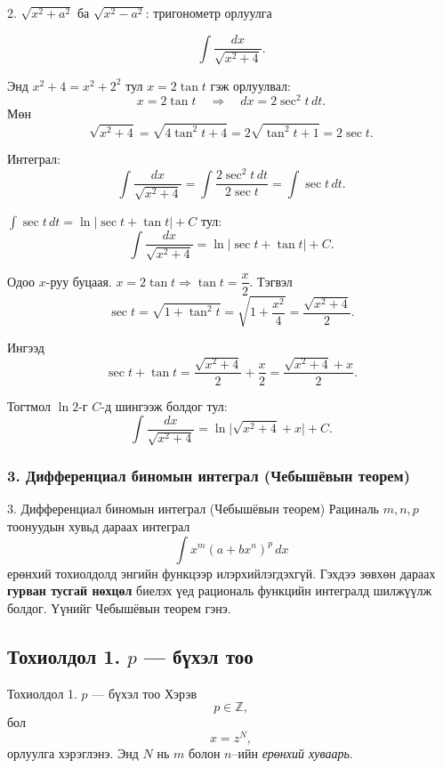 \begin{frame}[allowframebreaks]{2. $\sqrt{x^2+a^2}$ ба $\sqrt{x^2-a^2}$: тригонометр орлуулга}
\begin{example}
\[
\int \frac{dx}{\sqrt{x^2+4}}.
\]

Энд $x^2+4 = x^2+2^2$ тул $x=2\tan t$ гэж орлуулвал:
\[
x = 2\tan t \quad\Rightarrow\quad dx = 2\sec^2 t\,dt.
\]
Мөн
\[
\sqrt{x^2+4}
= \sqrt{4\tan^2 t + 4}
= 2\sqrt{\tan^2 t+1}
= 2\sec t.
\]

Интеграл:
\[
\int \frac{dx}{\sqrt{x^2+4}}
= \int \frac{2\sec^2 t\,dt}{2\sec t}
= \int \sec t\,dt.
\]

$\displaystyle \int \sec t\,dt = \ln|\sec t + \tan t| + C$ тул:
\[
\int \frac{dx}{\sqrt{x^2+4}}
= \ln|\sec t + \tan t| + C.
\]

Одоо $x$-руу буцаая. $x=2\tan t \Rightarrow \tan t = \dfrac{x}{2}$. 
Тэгвэл
\[
\sec t = \sqrt{1+\tan^2 t}
= \sqrt{1+\frac{x^2}{4}}
= \frac{\sqrt{x^2+4}}{2}.
\]

Ингээд
\[
\sec t + \tan t = \frac{\sqrt{x^2+4}}{2} + \frac{x}{2}
= \frac{\sqrt{x^2+4}+x}{2}.
\]

Тогтмол $\ln 2$-г $C$-д шингээж болдог тул:
\[
\int \frac{dx}{\sqrt{x^2+4}}
= \ln\bigl|\sqrt{x^2+4}+x\bigr| + C.
\]
\end{example}
\end{frame}

\subsubsection*{3. Дифференциал биномын интеграл (Чебышёвын теорем)}
\begin{frame}[allowframebreaks]{3. Дифференциал биномын интеграл (Чебышёвын теорем)}
Рациналь $m,n,p$ тоонуудын хувьд дараах интеграл
\[
\int x^{m}(a+b x^{n})^{p}\,dx
\]
ерөнхий тохиолдолд энгийн функцээр илэрхийлэгдэхгүй. Гэхдээ зөвхөн дараах
\textbf{гурван тусгай нөхцөл} биелэх үед рациональ функцийн интегралд шилжүүлж болдог. Үүнийг Чебышёвын теорем гэнэ.
\end{frame}

\subsection*{Тохиолдол 1. $p$ — бүхэл тоо}
\begin{frame}[allowframebreaks]{Тохиолдол 1. $p$ — бүхэл тоо}
Хэрэв
\[
p\in \mathbb{Z},
\]
бол 
\[
x = z^{N},
\]
орлуулга хэрэглэнэ. Энд $N$ нь $m$ болон $n$–ийн  \emph{ерөнхий хуваарь}.
\end{frame}

